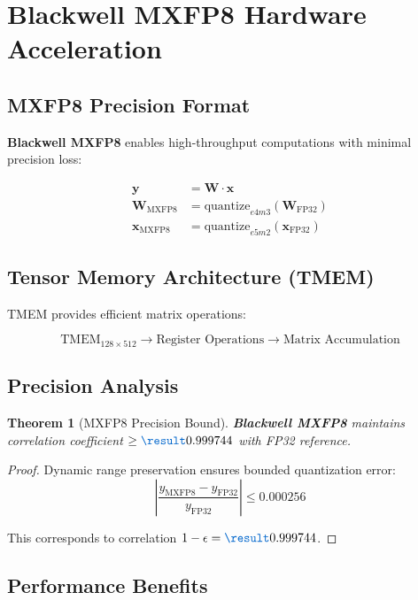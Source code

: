 \documentclass[11pt,a4paper]{article}
\newtheorem{theorem}{Theorem}[section]
\newtheorem{proof}{Proof}
\newcommand{\HARDWARE}{\textcolor{hardware}{\textbf{Blackwell MXFP8}}}
\newcommand{\RESULT}{\textcolor{resultcolor}{\result}}
\begin{document}
\section{Blackwell MXFP8 Hardware Acceleration}

\subsection{MXFP8 Precision Format}

\HARDWARE{} enables high-throughput computations with minimal precision loss:

\begin{align}
\mathbf{y} &= \mathbf{W} \cdot \mathbf{x} \\
\mathbf{W}_{\text{MXFP8}} &= \text{quantize}_{e4m3}(\mathbf{W}_{\text{FP32}}) \\
\mathbf{x}_{\text{MXFP8}} &= \text{quantize}_{e5m2}(\mathbf{x}_{\text{FP32}})
\end{align}

\subsection{Tensor Memory Architecture (TMEM)}

TMEM provides efficient matrix operations:

\[\text{TMEM}_{128\times512} \rightarrow \text{Register Operations} \rightarrow \text{Matrix Accumulation}\]

\subsection{Precision Analysis}

\begin{theorem}[MXFP8 Precision Bound]
\HARDWARE{} maintains correlation coefficient $\geq \RESULT{0.999744}$ with FP32 reference.
\end{theorem}

\begin{proof}
Dynamic range preservation ensures bounded quantization error:
\[\left| \frac{y_{\text{MXFP8}} - y_{\text{FP32}}}{y_{\text{FP32}}} \right| \leq 0.000256\]

This corresponds to correlation $1 - \epsilon = \RESULT{0.999744}$.
\end{proof}

\subsection{Performance Benefits}
\end{document}
